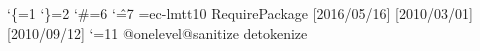 \catcode`\{=1 %
\catcode`\}=2 %
\catcode`\#=6 %
\catcode`\^=7 %
\font\rmfont=ec-lmtt10\relax
\rmfont
{} %
\begingroup\expandafter\expandafter\expandafter\endgroup
\expandafter\ifx\csname RequirePackage\endcsname\relax
  \relax
\else
  \RequirePackage{rotchiffre}[2016/05/16]%
  \RequirePackage{ifluatex}[2010/03/01]%
  \RequirePackage{ifxetex}[2010/09/12]%
\fi
\catcode`\@=11 %
\begingroup\expandafter\expandafter\expandafter\endgroup
\expandafter\ifx\csname @onelevel@sanitize\endcsname\relax
  \begingroup\expandafter\expandafter\expandafter\endgroup
  \expandafter\ifx\csname detokenize\endcsname\relax
    \def\strip@prefix#1->{}%
    \def\@onelevel@sanitize#1{%
      \edef#1{%
        \expandafter\strip@prefix\meaning#1%
      }%
    }%
  \else
    \def\@onelevel@sanitize#1{%
      \edef#1{%
        \detokenize\expandafter{#1}%
      }%
    }%
  \fi
\fi
\def\msg#{\immediate\write16}
\def\empty{}
\begingroup
  \def\x#1{%
    \def\space{#1}%
    \def\spacesII{#1#1}%
    \def\spacesIII{#1#1#1}%
    \def\spacesIV{#1#1#1#1}%
  }%
\expandafter\endgroup\x{ }
\def\PrintStr#1#2{%
  \begingroup
    \@onelevel@sanitize#2%
    \msg{#1: [#2]}%
  \endgroup
}
\def\CheckResult{%
  \PrintStr{Result}\StrResult
  \ifx\StrExpect\StrResult
    \msg{==> Ok}%
  \else
    \begingroup
    \edef\x{\endgroup
      \errmessage{Test failed (\chiffre)!}%
    }\x
  \fi
}
